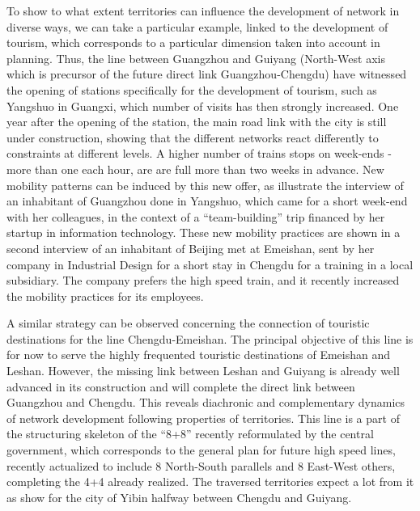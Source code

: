 To show to what extent territories can influence the development of network in diverse ways, we can take a particular example, linked to the development of tourism, which corresponds to a particular dimension taken into account in planning. Thus, the line between Guangzhou and Guiyang (North-West axis which is precursor of the future direct link Guangzhou-Chengdu) have witnessed the opening of stations specifically for the development of tourism, such as Yangshuo in Guangxi, which number of visits has then strongly increased. One year after the opening of the station, the main road link with the city is still under construction, showing that the different networks react differently to constraints at different levels. A higher number of trains stops on week-ends - more than one each hour, are are full more than two weeks in advance. New mobility patterns can be induced by this new offer, as illustrate the interview of an inhabitant of Guangzhou done in Yangshuo, which came for a short week-end with her colleagues, in the context of a ``team-building'' trip financed by her startup in information technology. These new mobility practices are shown in a second interview of an inhabitant of Beijing met at Emeishan, sent by her company in Industrial Design for a short stay in Chengdu for a training in a local subsidiary. The company prefers the high speed train, and it recently increased the mobility practices for its employees.

A similar strategy can be observed concerning the connection of touristic destinations for the line Chengdu-Emeishan. The principal objective of this line is for now to serve the highly frequented touristic destinations of Emeishan and Leshan. However, the missing link between Leshan and Guiyang is already well advanced in its construction and will complete the direct link between Guangzhou and Chengdu. This reveals diachronic and complementary dynamics of network development following properties of territories. This line is a part of the structuring skeleton of the ``8+8'' recently reformulated by the central government, which corresponds to the general plan for future high speed lines, recently actualized to include 8 North-South parallels and 8 East-West others, completing the 4+4 already realized.  The traversed territories expect a lot from it as show \cite{lu2012chengdu} for the city of Yibin halfway between Chengdu and Guiyang.

